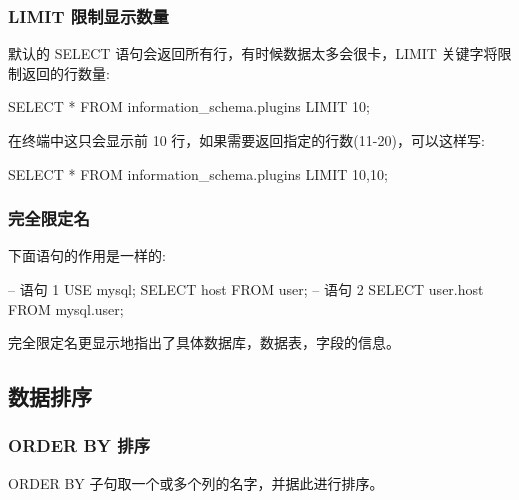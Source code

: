 \subsubsection{LIMIT 限制显示数量}

默认的 SELECT 语句会返回所有行，有时候数据太多会很卡，LIMIT 关键字将限制返回的行数量:

\begin{sql}
SELECT * FROM information_schema.plugins LIMIT 10;
\end{sql}

在终端中这只会显示前 10 行，如果需要返回指定的行数(11-20)，可以这样写:

\begin{sql}
SELECT * FROM information_schema.plugins LIMIT 10,10;
\end{sql}


\subsubsection*{完全限定名}

下面语句的作用是一样的:
\begin{sql}
-- 语句 1
USE mysql;
SELECT host FROM user;
-- 语句 2
SELECT user.host FROM mysql.user;
\end{sql}

完全限定名更显示地指出了具体数据库，数据表，字段的信息。

\subsection{数据排序}


\subsubsection{ORDER BY 排序}

ORDER BY 子句取一个或多个列的名字，并据此进行排序。

